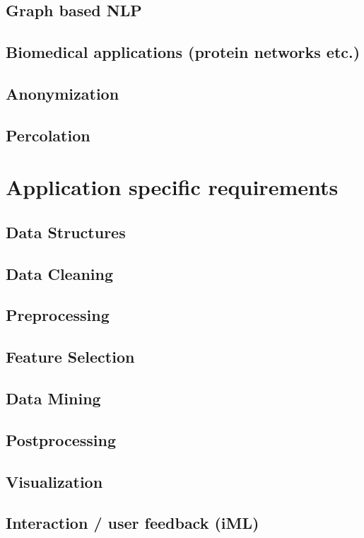 	\subsection{Graph based NLP}
	\label{ssect:app_graph_nlp}
	
	\subsection{Biomedical applications (protein networks etc.)}
	\label{ssect:app_biomed}
	
	\subsection{Anonymization}
	\label{ssect:app_snonymization}
	
	\subsection{Percolation}
	\label{ssect:app_percolation}




\section{Application specific requirements}
\label{section:app_requirements}

	\subsection{Data Structures}
	\label{ssect:data_gathering}
	
	\subsection{Data Cleaning}
	\label{ssect:data_cleaning}
	
	\subsection{Preprocessing}
	\label{ssect:preprocessing}
	
	\subsection{Feature Selection}
	\label{ssect:feature_selection}
	
	\subsection{Data Mining}
	\label{ssect:data_mining}
	
	\subsection{Postprocessing}
	\label{ssect:postprocessing}
	
	\subsection{Visualization}
	\label{ssect:visualization}
	
	\subsection{Interaction / user feedback (iML)}
	\label{ssect:interaction}
	